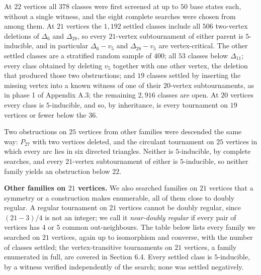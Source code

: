\documentclass[
]{article}
\newcounter{none} %
\begin{document}
At \(22\) vertices all \(378\) classes were first screened at up to
\(50\) base states each, without a single witness, and the eight
complete searches were chosen from among them. At \(21\) vertices the
\(1{,}192\) settled classes include all \(506\) two-vertex deletions of
\(\Delta_6\) and \(\Delta_{28}\), so every \(21\)-vertex subtournament
of either parent is \(5\)-inducible, and in particular
\(\Delta_6 - v_{5}\) and \(\Delta_{28} - v_{5}\) are vertex-critical.
The other settled classes are a stratified random sample of \(400\); all
\(53\) classes below \(\Delta_{11}\); every class obtained by deleting
\(v_5\) together with one other vertex, the deletion that produced those
two obstructions; and \(19\) classes settled by inserting the missing
vertex into a known witness of one of their \(20\)-vertex
subtournaments, as in phase 1 of Appendix A.3; the remaining \(2{,}916\)
classes are open. At \(20\) vertices every class is \(5\)-inducible, and
so, by inheritance, is every tournament on \(19\) vertices or fewer
below the \(36\).

Two obstructions on \(25\) vertices from other families were descended
the same way: \(P_{27}\) with two vertices deleted, and the circulant
tournament on \(25\) vertices in which every arc lies in six directed
triangles. Neither is \(5\)-inducible, by complete searches, and every
\(21\)-vertex subtournament of either is \(5\)-inducible, so neither
family yields an obstruction below \(22\).

\textbf{Other families on \(21\) vertices.} We also searched families on
\(21\) vertices that a symmetry or a construction makes enumerable, all
of them close to doubly regular. A regular tournament on \(21\) vertices
cannot be doubly regular, since \((21 - 3)/4\) is not an integer; we
call it \emph{near-doubly regular} if every pair of vertices has \(4\)
or \(5\) common out-neighbours. The table below lists every family we
searched on \(21\) vertices, again up to isomorphism and converse, with
the number of classes settled; the vertex-transitive tournaments on
\(21\) vertices, a family enumerated in full, are covered in Section
6.4. Every settled class is \(5\)-inducible, by a witness verified
independently of the search; none was settled negatively.
\end{document}
